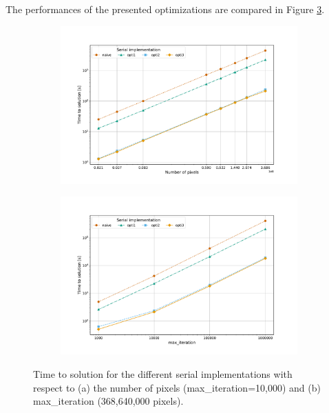 \documentclass[11pt,a4paper]{article}
\begin{document}
The performances of the presented optimizations are compared in Figure \ref{fig:serial-optis}.
\begin{figure}[t]
	\vspace{-0.7cm}
	\centering
	\begin{subfigure}{.5\textwidth}
		\centering
		\includegraphics[width=.99\linewidth, clip, trim={1.5cm 1cm 2.5cm 2cm}]{serial-optis-px.pdf}
		\caption{} 
		\label{fig:serial-optis-px}
	\end{subfigure}%
	\begin{subfigure}{.5\textwidth}
		\centering
		\includegraphics[width=.99\linewidth, clip, trim={1.5cm 1cm 2.5cm 2cm}]{serial-optis-maxiter.pdf}
		\caption{} 
		\label{fig:serial-optis-maxiter}
	\end{subfigure}
	\vspace{-0.4cm}
	\caption{Time to solution for the different serial implementations with respect to (a) the number of pixels (max\_iteration=10,000) and (b) max\_iteration (368,640,000 pixels).}
	\label{fig:serial-optis}
\end{figure}
\end{document}
